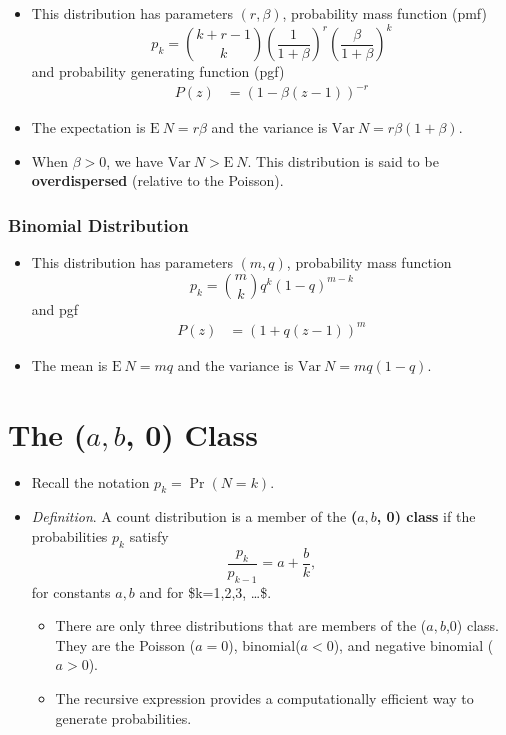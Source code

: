 \documentclass[]{book}
\theoremstyle{definition}
\theoremstyle{definition}
\theoremstyle{definition}
\theoremstyle{remark}
\begin{document}
\begin{itemize}
\item
  This distribution has parameters \((r, \beta)\), probability mass
  function (pmf)
  \[p_k = {k+r-1\choose k} \left(\frac{1}{1+\beta}\right)^r \left(\frac{\beta}{1+\beta}\right)^k\]
  and probability generating function (pgf) \[\begin{aligned}
  P(z) &= (1-\beta(z-1))^{-r} \end{aligned}\]
\item
  The expectation is \(\mathrm{E~}N = r\beta\) and the variance is
  \(\mathrm{Var~}N = r\beta(1+\beta)\).
\item
  When \(\beta>0\), we have \(\mathrm{Var~}N >\mathrm{E~}N\). This
  distribution is said to be \textbf{overdispersed} (relative to the
  Poisson).
\end{itemize}

\subsubsection{Binomial Distribution}\label{binomial-distribution}

\begin{itemize}
\item
  This distribution has parameters \((m,q)\), probability mass function
  \[p_k = {m\choose k} q^k (1-q)^{m-k}\] and pgf \[\begin{aligned}
  P(z) &= (1+q(z-1))^m\end{aligned}\]
\item
  The mean is \(\mathrm{E~}N = mq\) and the variance is
  \(\mathrm{Var~}N = mq(1-q)\).
\end{itemize}

\section{\texorpdfstring{The (\(a, b\), 0)
Class}{The (a, b, 0) Class}}\label{the-a-b-0-class}

\begin{itemize}
\item
  Recall the notation \(p_k= \Pr(N = k)\).
\item
  \emph{Definition}. A count distribution is a member of the
  \textbf{(\(a, b\), 0) class} if the probabilities \(p_k\) satisfy
  \[\frac{p_k}{p_{k-1}}=a+\frac{b}{k},\] for constants \(a,b\) and for
  \$k=1,2,3, \ldots \$.

  \begin{itemize}
  \item
    There are only three distributions that are members of the
    (\(a,b\),0) class. They are the Poisson (\(a=0\)),
    binomial(\(a<0\)), and negative binomial (\(a>0\)).
  \item
    The recursive expression provides a computationally efficient way to
    generate probabilities.
  \end{itemize}
\end{itemize}
\end{document}
